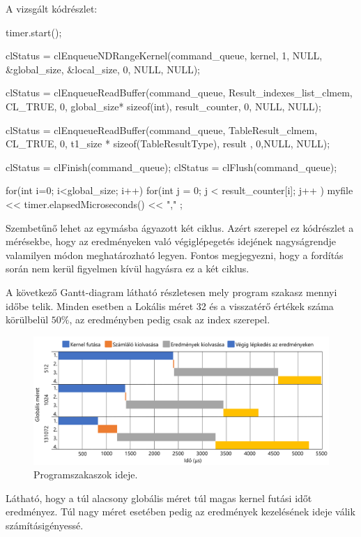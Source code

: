 A vizsgált kódrészlet:
\begin{python}  
timer.start();

clStatus = clEnqueueNDRangeKernel(command_queue, kernel, 1, NULL, 
	&global_size, &local_size, 0, NULL, NULL);

clStatus =
	clEnqueueReadBuffer(command_queue, Result_indexes_list_clmem, 
	CL_TRUE, 0, global_size* sizeof(int), 
	result_counter, 0, NULL, NULL);
	
clStatus = clEnqueueReadBuffer(command_queue, TableResult_clmem, 
	CL_TRUE, 0, t1_size * sizeof(TableResultType), 
	result  , 0,NULL, NULL);

clStatus = clFinish(command_queue);
clStatus = clFlush(command_queue);

for(int i=0; i<global_size; i++)
{
for(int j = 0; j < result_counter[i]; j++ ){}
}
myfile << timer.elapsedMicroseconds() << "," ;  
\end{python}

Szembetűnő lehet az egymásba ágyazott két ciklus. Azért szerepel ez kódrészlet a mérésekbe, hogy az eredményeken való végiglépegetés idejének nagyságrendje valamilyen módon meghatározható legyen. Fontos megjegyezni, hogy a fordítás során nem kerül figyelmen kívül hagyásra ez a két ciklus.

A következő Gantt-diagram látható részletesen mely program szakasz mennyi időbe telik.
Minden esetben a Lokális méret 32 és a visszatérő értékek száma körülbelül $50\%$, az eredményben pedig csak az index szerepel.

\begin{figure}[h!]
\centering
\includegraphics[width=\textwidth]{images/gantt.png}
\caption{Programszakaszok ideje.}
\label{fig:schema}
\end{figure}

Látható, hogy a túl alacsony globális méret túl magas kernel futási időt eredményez. Túl nagy méret esetében pedig az eredmények kezelésének ideje válik számításigényessé.

